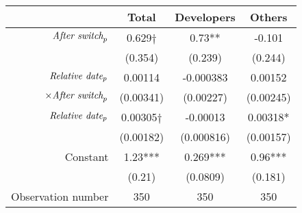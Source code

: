 \begin{tabular}{|r|c|c|c|}
\hline
&  Total & Developers & Others \\
\hline
$\mbox{\emph{After switch}}_p$ & 0.629$\dagger$ & 0.73** & -0.101 \\
 & (0.354) & (0.239) & (0.244) \\
\hline
$\mbox{\emph{Relative date}}_p$ & 0.00114 & -0.000383 & 0.00152 \\
$\times \mbox{\emph{After switch}}_p$ & (0.00341) & (0.00227) & (0.00245) \\
\hline
$\mbox{\emph{Relative date}}_p$ & 0.00305$\dagger$ & -0.00013 & 0.00318* \\
 & (0.00182) & (0.000816) & (0.00157) \\
\hline
Constant & 1.23*** & 0.269*** & 0.96*** \\
 & (0.21) & (0.0809) & (0.181) \\
\hline
Observation number & 350 & 350 & 350 \\
\hline
\end{tabular}